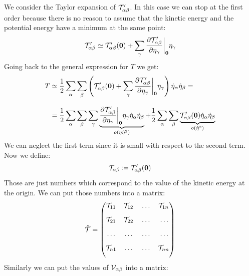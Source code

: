 We consider the Taylor expansion of $\mathcal{T}'_{\alpha \beta}$. In this case we can stop at the first order because there is no reason to assume that the kinetic energy and the potential energy have a minimum at the same point:
\begin{equation}
    \Telegant'_{\alpha \beta} \simeq \Telegant'_{\alpha \beta}(\vec{0}) + \bigsum_{\gamma}\pdv{\Telegant'_{\alpha \beta}}{\eta_{\gamma}}\bigg|_{\vec{0}}\eta_{\gamma}
\end{equation}
Going back to the general expression for $T$ we get:
\begin{equation}
    \begin{split}
        T &\simeq \dfrac{1}{2}\bigsum_{\alpha}\bigsum_{\beta}\brackets{\Telegant'_{\alpha \beta}(\vec{0}) + \bigsum_{\gamma}\pdv{\Telegant'_{\alpha \beta}}{\eta_{\gamma}}\bigg|_{\vec{0}}\eta_{\gamma}} \dot{\eta}_{\alpha}\dot{\eta}_{\beta} =\\[8pt]
        &= \dfrac{1}{2}\bigsum_{\alpha}\bigsum_{\beta}\bigsum_{\gamma}\underbrace{\pdv{\Telegant'_{\alpha \beta}}{\eta_{\gamma}}\bigg|_{\vec{0}}\eta_{\gamma} \dot{\eta}_{\alpha}\dot{\eta}_{\beta}}_{o(\eta \dot{\eta}^2)} + \dfrac{1}{2}\bigsum_{\alpha}\bigsum_{\beta}\underbrace{\Telegant'_{\alpha \beta}(\vec{0})\dot{\eta}_{\alpha}\dot{\eta}_{\beta}}_{o(\dot{\eta}^2)}
    \end{split}
\end{equation}
We can neglect the first term since it is small with respect to the second term. Now we define:
\begin{equation}
    \mathcal{T}_{\alpha \beta} \coloneqq \mathcal{T}'_{\alpha \beta}(\vb{0})
\end{equation}
Those are just numbers which correspond to the value of the kinetic energy at the origin. We can put those numbers into a matrix:
\begin{equation}
    \hat{\mathcal{T}}=
    \begin{pmatrix}
        \mathcal{T}_{1 1} & \mathcal{T}_{1 2} &  \,\dots\,  & \mathcal{T}_{1 n}\\[8pt]
        \mathcal{T}_{2 1} & \mathcal{T}_{2 2} &  \,\dots\,  &  \,\dots\, \\[8pt]
         \,\dots\,  &  \,\dots\,  &  \,\dots\,  &  \,\dots\, \\[8pt]
        \mathcal{T}_{n 1} &  \,\dots\,  &  \,\dots\,  & \mathcal{T}_{n n}\\[8pt]
    \end{pmatrix}
\end{equation}
Similarly we can put the values of $\mathcal{V}_{\alpha \beta}$ into a matrix:
